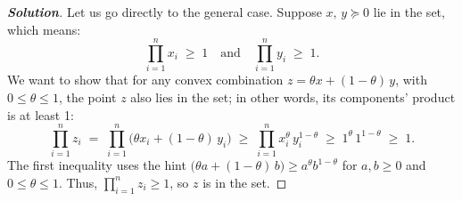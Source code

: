 \documentclass[12pt]{article}
\newenvironment{Solution}
  {\begin{proof}[\textbf{Solution}]}
  {\end{proof}}
\begin{document}
\begin{Solution}
Let us go directly to the general case. Suppose \(x,\,y \succeq 0\) lie in the set, which means:
\[
  \prod_{i=1}^n x_i \;\geq\; 1
  \quad\text{and}\quad
  \prod_{i=1}^n y_i \;\geq\; 1.
\]
We want to show that for any convex combination \(z = \theta x + (1-\theta)\,y\), with \(0 \leq \theta \leq 1\), the point \(z\) also lies in the set; in other words, its components’ product is at least 1:
\[
  \prod_{i=1}^n z_i
  \;=\;
  \prod_{i=1}^n 
  \bigl(\theta x_i + (1-\theta)\,y_i\bigr)
  \;\geq\;
  \prod_{i=1}^n x_i^{\theta}\,y_i^{1-\theta}
  \;\geq\;
  1^{\theta}\,1^{1-\theta}
  \;\geq\;
  1.
\]
The first inequality uses the hint 
\(\bigl(\theta a + (1-\theta)\,b\bigr) \geq a^{\theta} b^{1-\theta}\) 
for \(a,b \geq 0\) and \(0 \leq \theta \leq 1\). 
Thus, \(\prod_{i=1}^n z_i \geq 1\), so \(z\) is in the set. 
\end{Solution}
\end{document}
